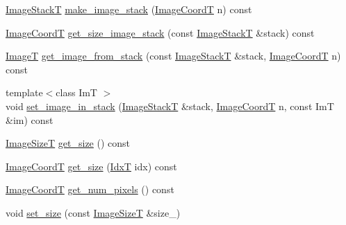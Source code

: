 \begin{DoxyCompactItemize}
\item 
\hyperlink{classmappel_1_1ImageFormat1DBase_a81e3246d1c5c37ebf9077b7b5bd25a76}{Image\+StackT} \hyperlink{classmappel_1_1ImageFormat1DBase_ab2c4470c335a6abb2d3b9c442339ca0c}{make\+\_\+image\+\_\+stack} (\hyperlink{classmappel_1_1ImageFormat1DBase_a82ab3168eb1a87eaeb3e7c919188e9fc}{Image\+CoordT} n) const 
\item 
\hyperlink{classmappel_1_1ImageFormat1DBase_a82ab3168eb1a87eaeb3e7c919188e9fc}{Image\+CoordT} \hyperlink{classmappel_1_1ImageFormat1DBase_afa0e79b58955f5ecfd39c8f8d06f22ad}{get\+\_\+size\+\_\+image\+\_\+stack} (const \hyperlink{classmappel_1_1ImageFormat1DBase_a81e3246d1c5c37ebf9077b7b5bd25a76}{Image\+StackT} \&stack) const 
\item 
\hyperlink{classmappel_1_1ImageFormat1DBase_a521a1ff391a52a636fac4aac7c7ba02c}{ImageT} \hyperlink{classmappel_1_1ImageFormat1DBase_a92d3d803a82402adcca516b53e8d5100}{get\+\_\+image\+\_\+from\+\_\+stack} (const \hyperlink{classmappel_1_1ImageFormat1DBase_a81e3246d1c5c37ebf9077b7b5bd25a76}{Image\+StackT} \&stack, \hyperlink{classmappel_1_1ImageFormat1DBase_a82ab3168eb1a87eaeb3e7c919188e9fc}{Image\+CoordT} n) const 
\item 
{\footnotesize template$<$class ImT $>$ }\\void \hyperlink{classmappel_1_1ImageFormat1DBase_a90fcfb6e39374e4372ec1cedf3c2cb91}{set\+\_\+image\+\_\+in\+\_\+stack} (\hyperlink{classmappel_1_1ImageFormat1DBase_a81e3246d1c5c37ebf9077b7b5bd25a76}{Image\+StackT} \&stack, \hyperlink{classmappel_1_1ImageFormat1DBase_a82ab3168eb1a87eaeb3e7c919188e9fc}{Image\+CoordT} n, const ImT \&im) const 
\item 
\hyperlink{classmappel_1_1ImageFormat1DBase_a6456bab2b26702022ee32ae19e90dcac}{Image\+SizeT} \hyperlink{classmappel_1_1ImageFormat1DBase_aea1194302eccc0d8ad62394176aa6b0c}{get\+\_\+size} () const 
\item 
\hyperlink{classmappel_1_1ImageFormat1DBase_a82ab3168eb1a87eaeb3e7c919188e9fc}{Image\+CoordT} \hyperlink{classmappel_1_1ImageFormat1DBase_a995bdd3b1be616d8d87af3a4a51fbad8}{get\+\_\+size} (\hyperlink{namespacemappel_ab17ec0f30b61ece292439d7ece81d3a8}{IdxT} idx) const 
\item 
\hyperlink{classmappel_1_1ImageFormat1DBase_a82ab3168eb1a87eaeb3e7c919188e9fc}{Image\+CoordT} \hyperlink{classmappel_1_1ImageFormat1DBase_a96644883bef9d230eea893ece4578e96}{get\+\_\+num\+\_\+pixels} () const 
\item 
void \hyperlink{classmappel_1_1ImageFormat1DBase_ad169407f15bd43b0cec18fa2c88725b7}{set\+\_\+size} (const \hyperlink{classmappel_1_1ImageFormat1DBase_a6456bab2b26702022ee32ae19e90dcac}{Image\+SizeT} \&size\+\_\+)

\end{DoxyCompactItemize}
